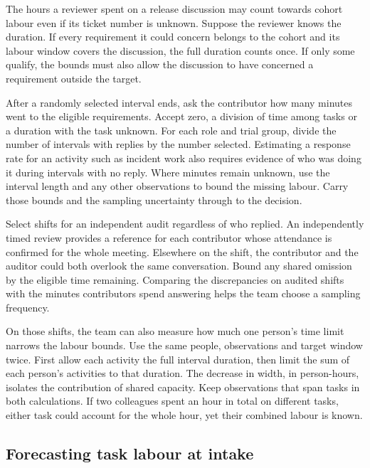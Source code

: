 \documentclass[11pt,a4paper]{amsart}
\begin{document}
The hours a reviewer spent on a release discussion may count towards cohort labour even if its ticket number is unknown. Suppose the reviewer knows the duration. If every requirement it could concern belongs to the cohort and its labour window covers the discussion, the full duration counts once. If only some qualify, the bounds must also allow the discussion to have concerned a requirement outside the target.

After a randomly selected interval ends, ask the contributor how many minutes went to the eligible requirements. Accept zero, a division of time among tasks or a duration with the task unknown. For each role and trial group, divide the number of intervals with replies by the number selected. Estimating a response rate for an activity such as incident work also requires evidence of who was doing it during intervals with no reply. Where minutes remain unknown, use the interval length and any other observations to bound the missing labour. Carry those bounds and the sampling uncertainty through to the decision.

Select shifts for an independent audit regardless of who replied. An independently timed review provides a reference for each contributor whose attendance is confirmed for the whole meeting. Elsewhere on the shift, the contributor and the auditor could both overlook the same conversation. Bound any shared omission by the eligible time remaining. Comparing the discrepancies on audited shifts with the minutes contributors spend answering helps the team choose a sampling frequency.

On those shifts, the team can also measure how much one person's time limit narrows the labour bounds. Use the same people, observations and target window twice. First allow each activity the full interval duration, then limit the sum of each person's activities to that duration. The decrease in width, in person-hours, isolates the contribution of shared capacity. Keep observations that span tasks in both calculations. If two colleagues spent an hour in total on different tasks, either task could account for the whole hour, yet their combined labour is known.

\subsection{Forecasting task labour at intake}
\label{sec:labour-prediction-validation}


\end{document}
